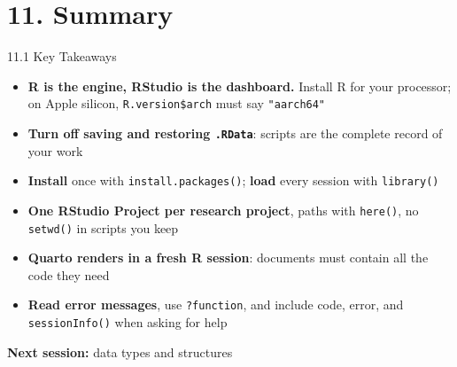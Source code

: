 \documentclass[
  ignorenonframetext,
  aspectratio=169,
]{beamer}
\providecommand{\tightlist}{%
  \setlength{\itemsep}{0pt}\setlength{\parskip}{0pt}}
\begin{document}
\section{11. Summary}\label{sec-summary}

\begin{frame}[fragile]{11.1 Key Takeaways}
\protect{}\label{key-takeaways}
\begin{itemize}
\tightlist
\item
  \textbf{R is the engine, RStudio is the dashboard.} Install R for your
  processor; on Apple silicon, \texttt{R.version\$arch} must say
  \texttt{"aarch64"}
\item
  \textbf{Turn off saving and restoring \texttt{.RData}}: scripts are
  the complete record of your work
\item
  \textbf{Install} once with \texttt{install.packages()}; \textbf{load}
  every session with \texttt{library()}
\item
  \textbf{One RStudio Project per research project}, paths with
  \texttt{here()}, no \texttt{setwd()} in scripts you keep
\item
  \textbf{Quarto renders in a fresh R session}: documents must contain
  all the code they need
\item
  \textbf{Read error messages}, use \texttt{?function}, and include
  code, error, and \texttt{sessionInfo()} when asking for help
\end{itemize}

\textbf{Next session:} data types and structures
\end{frame}
\end{document}
